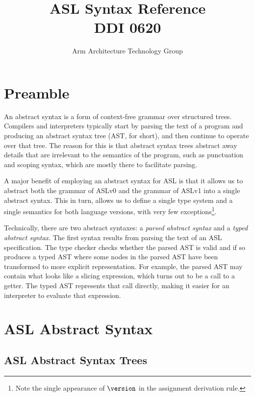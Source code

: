 \documentclass{book}
\author{Arm Architecture Technology Group}
\title{ASL Syntax Reference \\
       DDI 0620}
\begin{document}
\maketitle

\tableofcontents{}





\chapter{Preamble}
An abstract syntax is a form of context-free grammar over structured trees. Compilers and interpreters typically start by parsing the text of a program and producing an abstract syntax tree (AST, for short), and then continue to operate over that tree.
%
The reason for this is that abstract syntax trees abstract away details that are irrelevant to the semantics of the program, such as punctuation and scoping syntax, which are mostly there to facilitate parsing.

A major benefit of employing an abstract syntax for ASL is that it allows us to abstract both the grammar of ASLv0 and the grammar of ASLv1 into a single abstract syntax. This in turn, allows us to define a single type system and a single semantics for both language versions, with very few exceptions\footnote{Note the single appearance of $\version$ in the assignment derivation rule.}.

Technically, there are two abstract syntaxes:
a \emph{parsed abstract syntax} and a \emph{typed abstract syntax}.
The first syntax results from parsing the text of an ASL specification.
The type checker checks whether the parsed AST is valid and if so produces
a typed AST where some nodes in the parsed AST have been transformed to
more explicit representation. For example, the parsed AST may contain
what looks like a slicing expression, which turns out to be a call to a getter.
The typed AST represents that call directly, making it easier for an interpreter
to evaluate that expression.

\chapter{ASL Abstract Syntax}

\section{ASL Abstract Syntax Trees}
\end{document}
